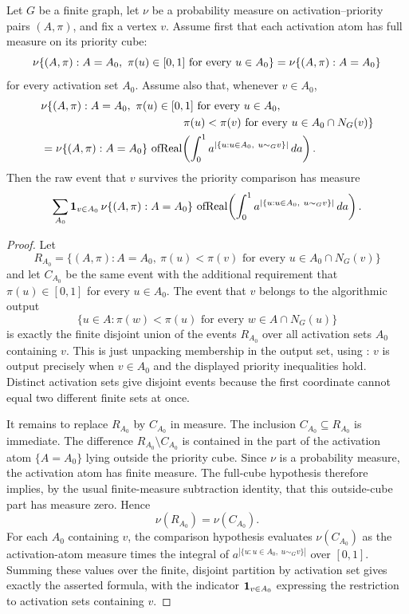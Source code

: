 \begin{helper}
Let $G$ be a finite graph, let $\nu$ be a probability measure on
activation--priority pairs $(A,\pi)$, and fix a vertex $v$.  Assume first
that each activation atom has full measure on its priority cube:
\[
\nu\{(A,\pi): A=A_0,\ \pi(u)\in[0,1]\hbox{ for every }u\in A_0\}
=\nu\{(A,\pi):A=A_0\}
\]
for every activation set $A_0$.  Assume also that, whenever $v\in A_0$,
\[
\begin{aligned}
&\nu\{(A,\pi):A=A_0,\ \pi(u)\in[0,1]\hbox{ for every }u\in A_0,\\
&\hspace{4.5cm}
\pi(u)<\pi(v)\hbox{ for every }u\in A_0\cap N_G(v)\}\\
&=\nu\{(A,\pi):A=A_0\}\,
\operatorname{ofReal}\!\left(\int_0^1
a^{|\{u:u\in A_0,\ u\sim_G v\}|}\,da\right).
\end{aligned}
\]
Then the raw event that $v$ survives the priority comparison has measure
\[
\sum_{A_0}
{\bf 1}_{v\in A_0}\,
\nu\{(A,\pi):A=A_0\}\,
\operatorname{ofReal}\!\left(\int_0^1
a^{|\{u:u\in A_0,\ u\sim_G v\}|}\,da\right).
\]
\end{helper}
\begin{proof}
Let
\[
R_{A_0}=\{(A,\pi):A=A_0,\ \pi(u)<\pi(v)
\text{ for every }u\in A_0\cap N_G(v)\}
\]
and let $C_{A_0}$ be the same event with the additional requirement that
$\pi(u)\in[0,1]$ for every $u\in A_0$.  The event that $v$ belongs to the
algorithmic output
\[
\{u\in A:\pi(w)<\pi(u)\text{ for every }w\in A\cap N_G(u)\}
\]
is exactly the finite disjoint union of the events $R_{A_0}$ over all
activation sets $A_0$ containing $v$.  This is just unpacking membership in
the output set, using : $v$ is
output precisely when $v\in A_0$ and the displayed priority inequalities
hold.  Distinct activation sets give disjoint events because the first
coordinate cannot equal two different finite sets at once.

It remains to replace $R_{A_0}$ by $C_{A_0}$ in measure.  The inclusion
$C_{A_0}\subseteq R_{A_0}$ is immediate.  The difference
$R_{A_0}\setminus C_{A_0}$ is contained in the part of the activation atom
$\{A=A_0\}$ lying outside the priority cube.  Since $\nu$ is a probability
measure, the activation atom has finite measure.  The full-cube hypothesis
therefore implies, by the usual finite-measure subtraction identity, that
this outside-cube part has measure zero.  Hence
\[
\nu(R_{A_0})=\nu(C_{A_0}).
\]
For each $A_0$ containing $v$, the comparison hypothesis evaluates
$\nu(C_{A_0})$ as the activation-atom measure times the integral of
$a^{|\{u:u\in A_0,\ u\sim_G v\}|}$ over $[0,1]$.  Summing these values over
the finite, disjoint partition by activation set gives exactly the asserted
formula, with the indicator ${\bf 1}_{v\in A_0}$ expressing the restriction
to activation sets containing $v$.
\end{proof}
